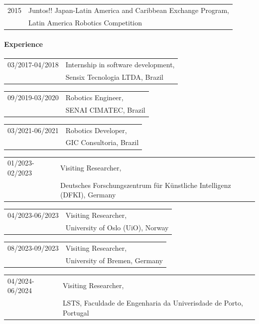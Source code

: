 \begin{longtable}{p{} p{}}
    2015 & Juntos!! Japan-Latin America and Caribbean Exchange Program, \\
         & Latin America Robotics Competition
\end{longtable}

\paragraph{Experience}
\begin{longtable}{p{} p{}}
    03/2017-04/2018 & Internship in software development, \\
              & Sensix Tecnologia LTDA, Brazil
\end{longtable}

\begin{longtable}{p{} p{}}
    09/2019-03/2020 & Robotics Engineer, \\
              & SENAI CIMATEC, Brazil
\end{longtable}

\begin{longtable}{p{} p{}}
    03/2021-06/2021 & Robotics Developer, \\
              & GIC Consultoria, Brazil
\end{longtable}

\begin{longtable}{p{} p{}}
    01/2023-02/2023 & Visiting Researcher, \\
              & Deutsches Forschungszentrum für Künstliche Intelligenz (DFKI), Germany
\end{longtable}

\begin{longtable}{p{} p{}}
    04/2023-06/2023 & Visiting Researcher, \\
              & University of Oslo (UiO), Norway
\end{longtable}

\begin{longtable}{p{} p{}}
    08/2023-09/2023 & Visiting Researcher, \\
              & University of Bremen, Germany
\end{longtable}

\begin{longtable}{p{} p{}}
    04/2024-06/2024 & Visiting Researcher, \\
              & LSTS, Faculdade de Engenharia da Univerisdade de Porto, Portugal
\end{longtable}
